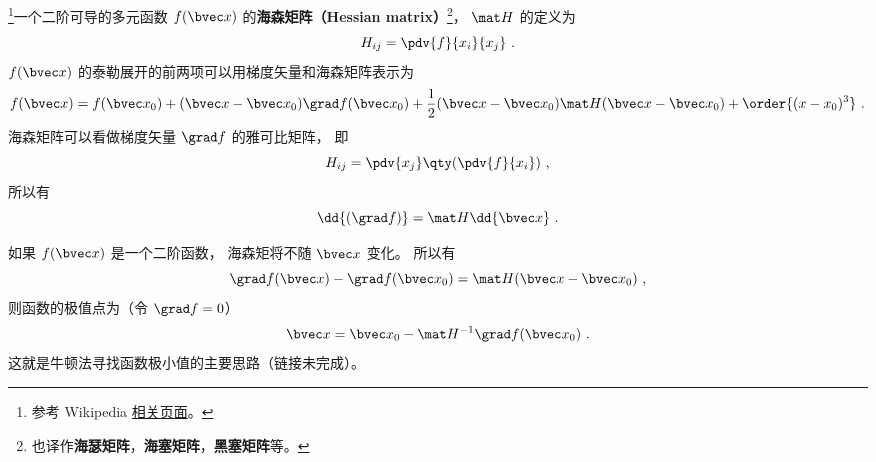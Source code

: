 
\begin{issues}
\issueDraft
\end{issues}


\footnote{参考 Wikipedia \href{https://en.wikipedia.org/wiki/Hessian_matrix}{相关页面}。}一个二阶可导的多元函数 $f(\bvec x)$ 的\textbf{海森矩阵（Hessian matrix）}\footnote{也译作\textbf{海瑟矩阵}，\textbf{海塞矩阵}，\textbf{黑塞矩阵}等。}， $\mat H$ 的定义为
\begin{equation}
H_{ij} = \pdv{f}{x_i}{x_j}~.
\end{equation}
$f(\bvec x)$ 的泰勒展开的前两项可以用梯度矢量和海森矩阵表示为
\begin{equation}
f(\bvec x) = f(\bvec x_0) + (\bvec x - \bvec x_0) \grad f(\bvec x_0) + \frac12(\bvec x - \bvec x_0) \mat H (\bvec x - \bvec x_0) + \order{(x-x_0)^3}~.
\end{equation}
海森矩阵可以看做梯度矢量 $\grad f$ 的雅可比矩阵， 即
\begin{equation}
H_{ij} = \pdv{x_j} \qty(\pdv{f}{x_i})~,
\end{equation}
所以有
\begin{equation}
\dd{(\grad f)} = \mat H \dd{\bvec x}~.
\end{equation}

如果 $f(\bvec x)$ 是一个二阶函数， 海森矩将不随 $\bvec x$ 变化。 所以有
\begin{equation}
\grad f(\bvec x) - \grad f(\bvec x_0) = \mat H (\bvec x - \bvec x_0)~,
\end{equation}
则函数的极值点为（令 $\grad f = 0$）
\begin{equation}
\bvec x = \bvec x_0 - \mat H^{-1} \grad f(\bvec x_0)~.
\end{equation}
这就是牛顿法寻找函数极小值的主要思路（链接未完成）。
